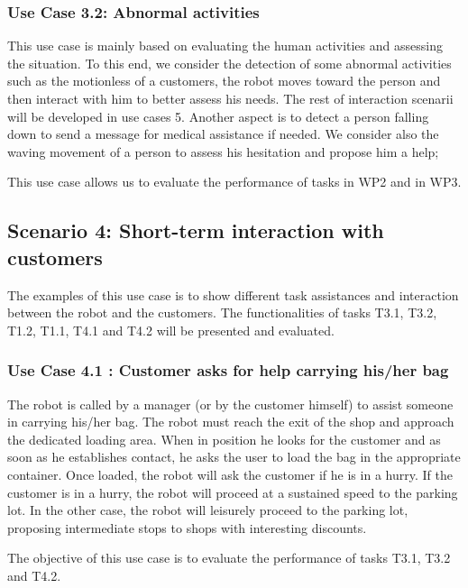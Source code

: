 \subsubsection*{Use Case 3.2: Abnormal activities}
This use case is mainly based on evaluating the human activities and assessing the situation. To this end, we consider the detection of some abnormal activities such as 
 the motionless of a customers, the robot moves toward the person and then interact with him to better assess his needs. The rest of interaction scenarii will be developed in use cases 5. Another aspect is to detect a person falling down to send a message for medical assistance if needed. We consider also the waving movement of a person to assess his hesitation and propose him a help;  

This use case allows us to evaluate the performance of tasks in WP2 and in WP3. 

\subsection{Scenario 4: Short-term interaction with customers}
The examples of this use case is to show different task assistances and interaction between the robot and the customers. The functionalities of tasks T3.1, T3.2, T1.2, T1.1, T4.1 and T4.2 will be presented and evaluated. 

\subsubsection*{Use Case 4.1 : Customer asks for help carrying his/her bag}
The robot is called by a manager (or by the customer himself) to assist
someone in carrying his/her bag. The robot must reach
the exit of the shop and approach the dedicated loading area. When
in position he looks for the customer and as soon as he establishes
contact, he asks the user to load the bag in the appropriate container.
Once loaded, the robot will ask the customer if he is in a hurry.
If the customer is in a hurry, the robot will proceed at a sustained
speed to the parking lot. In the other case, the robot will leisurely
proceed to the parking lot, proposing intermediate stops to shops
with interesting discounts.

The objective of this use case is to evaluate the performance of tasks T3.1, T3.2 and T4.2.
 
